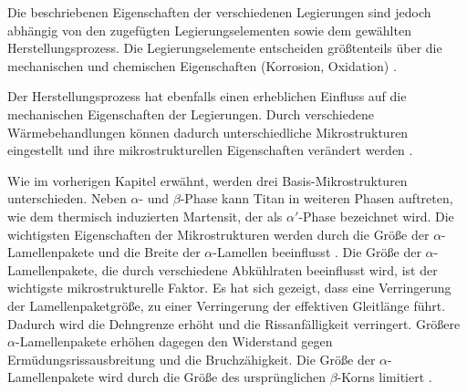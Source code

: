 Die beschriebenen Eigenschaften der verschiedenen Legierungen sind jedoch abhängig von den zugefügten Legierungselementen sowie dem gewählten Herstellungsprozess.
Die Legierungselemente entscheiden größtenteils über die mechanischen und chemischen Eigenschaften (Korrosion, Oxidation) \cite{C.Leyens.2005,Lutjering.2007,M.J.Donachie.2010}.

Der Herstellungsprozess hat ebenfalls einen erheblichen Einfluss auf die mechanischen Eigenschaften der Legierungen. Durch verschiedene Wärmebehandlungen können dadurch unterschiedliche Mikrostrukturen eingestellt und ihre mikrostrukturellen Eigenschaften verändert werden \cite{C.Leyens.2005,Lutjering.2007,Boyer.2007,M.J.Donachie.2010}.

Wie im vorherigen Kapitel erwähnt, werden drei Basis-Mikrostrukturen unterschieden. Neben $\alpha$- und $\beta$-Phase kann Titan in weiteren Phasen auftreten, wie dem thermisch induzierten Martensit, der als $\alpha'$-Phase bezeichnet wird. Die wichtigsten Eigenschaften der Mikrostrukturen werden durch die Größe der $\alpha$-Lamellenpakete und die Breite der $\alpha$-Lamellen beeinflusst \cite{C.Leyens.2005,Lutjering.2007,Boyer.2007}. Die Größe der $\alpha$-Lamellenpakete, die durch verschiedene Abkühlraten beeinflusst wird, ist der wichtigste mikrostrukturelle Faktor. Es hat sich gezeigt, dass eine Verringerung der Lamellenpaketgröße, zu einer Verringerung der effektiven Gleitlänge führt. Dadurch wird die Dehngrenze erhöht und die Rissanfälligkeit verringert. Größere $\alpha$-Lamellenpakete erhöhen dagegen den Widerstand gegen Ermüdungsrissausbreitung und die Bruchzähigkeit. Die Größe der $\alpha$-Lamellenpakete wird durch die Größe des ursprünglichen $\beta$-Korns limitiert \cite{C.Leyens.2005,Lutjering.2007,M.J.Donachie.2010}.


